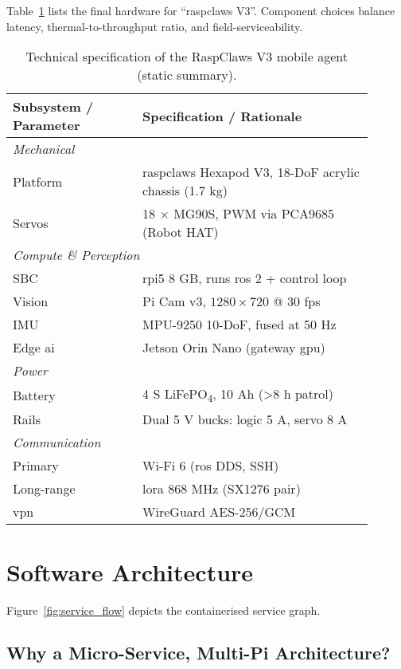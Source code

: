 Table~\ref{tab:raspclaws-spec} lists the final hardware for “\gls{raspclaws} V3”.
Component choices balance latency,
thermal-to-throughput ratio, and field-serviceability.

\begin{table}[ht]
\centering
\footnotesize
\caption{Technical specification of the RaspClaws V3 mobile agent (static summary).}
\label{tab:raspclaws-spec}
\begin{tabular}{@{}p{0.32\linewidth} p{0.58\linewidth}@{}}
\toprule
\textbf{Subsystem / Parameter} & \textbf{Specification / Rationale}\\\midrule
\multicolumn{2}{l}{\emph{Mechanical}}\\
Platform & \gls{raspclaws} Hexapod V3, 18-DoF acrylic chassis (1.7 kg) \\
Servos   & 18 × MG90S, PWM via PCA9685 (Robot HAT)\\[2pt]
\multicolumn{2}{l}{\emph{Compute \& Perception}}\\
SBC      & \gls{rpi5} 8 GB, runs \gls{ros} 2 + control loop\\
Vision   & Pi Cam v3, $1280\times720$ @ 30 fps\\
IMU      & MPU-9250 10-DoF, fused at 50 Hz\\
Edge \gls{ai} & Jetson Orin Nano (gateway \gls{gpu})\\[2pt]
\multicolumn{2}{l}{\emph{Power}}\\
Battery  & 4 S LiFePO\textsubscript{4}, 10 Ah (>8 h patrol)\\
Rails    & Dual 5 V bucks: logic 5 A, servo 8 A\\[2pt]
\multicolumn{2}{l}{\emph{Communication}}\\
Primary  & Wi-Fi 6 (\gls{ros} DDS, SSH)\\
Long-range & \gls{lora} 868 MHz (SX1276 pair) \\
\gls{vpn} & WireGuard AES-256/GCM \\
\bottomrule
\end{tabular}
\end{table}

\section{Software Architecture}
\label{sec:impl:software}

Figure~\ref{fig:service_flow} depicts the containerised service graph.

\subsection{Why a Micro-Service, Multi-Pi Architecture?}\label{subsec:why-a-micro-service-multi-pi-architecture?}

